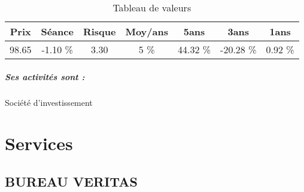 \documentclass[11pt,a4paper]{report}%
\begin{document}
\begin{table}[H]
  \centering
    \begin{tabular}{|c|c|c|c|c|c|c|}
    \hline
    Prix & Séance & Risque  & Moy/ans & 5ans & 3ans & 1ans \\
    \hline
    98.65 &    -1.10 \%    & 3.30 & 5 \% & 44.32 \% & -20.28 \% & 0.92 \% \\
    \hline
    \end{tabular}%
        \label{tab:table_WENDEL}%
      \caption{Tableau de valeurs}
\end{table}%

\paragraph{Ses activités sont : } Société d'investissement  
    
    \newpage\chapter{Services}


\section{BUREAU VERITAS}
\end{document}
